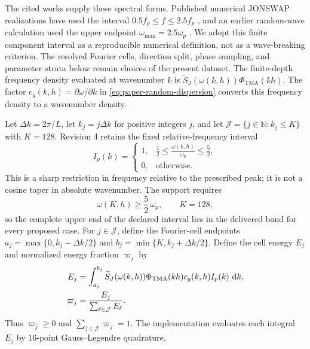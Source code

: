 The cited works supply these spectral forms.  Published numerical JONSWAP
realizations have used the interval
$0.5f_p\leq f\leq2.5f_p$ \cite{draycott2026}, and an earlier random-wave
calculation used the upper endpoint
$\omega_{\max}=2.5\omega_p$ \cite{grice2015}.  We adopt this finite component
interval as a reproducible numerical definition, not as a wave-breaking
criterion.  The resolved Fourier cells, direction split, phase sampling, and
parameter strata below remain choices of the present dataset.
The finite-depth frequency density evaluated at wavenumber $k$ is
$\widetilde S_J(\omega(k,h))\Phi_{\mathrm{TMA}}(kh)$.  The factor
$c_g(k,h)=\partial\omega/\partial k$ in
\cref{eq:paper-random-dispersion} converts this frequency density to a
wavenumber density.

Let $\Delta k=2\pi/L$, let $k_j=j\Delta k$ for positive integers $j$, and
let $\mathcal J=\{j\in\mathbb N:k_j\leq K\}$ with $K=128$.  Revision 4
retains the fixed relative-frequency interval
\begin{equation}
  I_p(k)
  =
  \begin{cases}
    1,&\displaystyle \frac12\leq
       \frac{\omega(k,h)}{\omega_p}\leq\frac52,\\
    0,&\text{otherwise}.
  \end{cases}
  \label{eq:paper-random-relative-frequency-window}
\end{equation}
This is a sharp restriction in frequency relative to the prescribed peak; it
is not a cosine taper in absolute wavenumber.  The support requires
\begin{equation}
  \omega(K,h)\geq\frac52\,\omega_p,
  \qquad K=128,
  \label{eq:paper-random-relative-frequency-fit}
\end{equation}
so the complete upper end of the declared interval lies in the delivered
band for every proposed case.
For $j\in\mathcal J$, define the Fourier-cell endpoints
$a_j=\max\{0,k_j-\Delta k/2\}$ and
$b_j=\min\{K,k_j+\Delta k/2\}$.  Define the cell energy $E_j$ and normalized
energy fraction $\varpi_j$ by
\begin{align}
  E_j
  &=
  \int_{a_j}^{b_j}
  \widetilde S_J(\omega(k,h))
  \Phi_{\mathrm{TMA}}(kh)c_g(k,h)I_p(k)\,\,\mathrm{d} k,
  \notag\\
  \varpi_j
  &=
  \frac{E_j}{\sum_{\ell\in\mathcal J}E_\ell}.
  \label{eq:paper-random-cell-energy}
\end{align}
Thus $\varpi_j\geq0$ and $\sum_{j\in\mathcal J}\varpi_j=1$.
The implementation evaluates each integral $E_j$ by 16-point
Gauss--Legendre quadrature.

